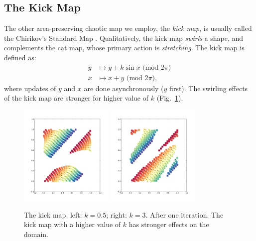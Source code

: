 \documentclass[12pt]{reedmcm}
\begin{document}
\subsection{The Kick Map}
The other area-preserving chaotic map we employ, the \textit{kick map}, is usually called the Chirikov's Standard Map \citep{ott}.
Qualitatively, the kick map \textit{swirls} a shape, and complements the cat map, whose primary action is \textit{stretching}.
The kick map is defined as:
\begin{align*}
  y &\mapsto y + k \sin x \mbox{ (mod $2\pi$)} \\
  x &\mapsto x + y \mbox{ (mod $2\pi$)},
\end{align*}
where updates of $y$ and $x$ are done asynchronously ($y$ first).
The swirling effects of the kick map are stronger for higher value of $k$ (Fig.~\ref{fig:kickmap_demo1}).
%
\begin{figure}[p]
  \centering
  \includegraphics[width=0.4\textwidth]{kickmap_05}
  \hspace{2cm}
  \includegraphics[width=0.4\textwidth]{kickmap_3}
  \caption{The kick map. left: $k=0.5$; right: $k = 3$. After one iteration. 
    The kick map with a higher value of $k$ has stronger effects on the domain.
  }
  \label{fig:kickmap_demo1}
\end{figure}
%
\end{document}
